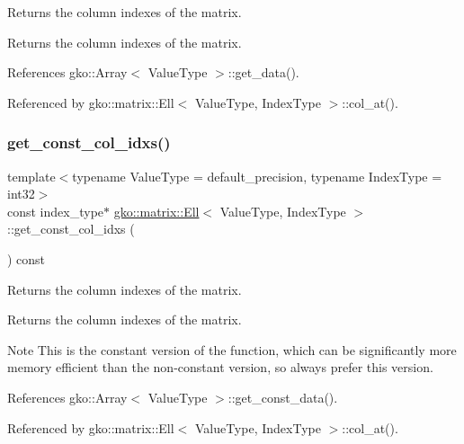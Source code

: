 Returns the column indexes of the matrix. 

\begin{DoxyReturn}{Returns}
the column indexes of the matrix. 
\end{DoxyReturn}


References gko\+::\+Array$<$ Value\+Type $>$\+::get\+\_\+data().



Referenced by gko\+::matrix\+::\+Ell$<$ Value\+Type, Index\+Type $>$\+::col\+\_\+at().

\mbox{\label{classgko_1_1matrix_1_1Ell_addb3c84f52b090c75f519833fb379cef}} 
\subsubsection{\texorpdfstring{get\+\_\+const\+\_\+col\+\_\+idxs()}{get\_const\_col\_idxs()}}
{\footnotesize\ttfamily template$<$typename Value\+Type = default\+\_\+precision, typename Index\+Type = int32$>$ \\
const index\+\_\+type$\ast$ \hyperlink{classgko_1_1matrix_1_1Ell}{gko\+::matrix\+::\+Ell}$<$ Value\+Type, Index\+Type $>$\+::get\+\_\+const\+\_\+col\+\_\+idxs (\begin{DoxyParamCaption}{ }\end{DoxyParamCaption}) const\hspace{0.3cm}{\ttfamily [noexcept]}}



Returns the column indexes of the matrix. 

\begin{DoxyReturn}{Returns}
the column indexes of the matrix.
\end{DoxyReturn}
\begin{DoxyNote}{Note}
This is the constant version of the function, which can be significantly more memory efficient than the non-\/constant version, so always prefer this version. 
\end{DoxyNote}


References gko\+::\+Array$<$ Value\+Type $>$\+::get\+\_\+const\+\_\+data().



Referenced by gko\+::matrix\+::\+Ell$<$ Value\+Type, Index\+Type $>$\+::col\+\_\+at().

